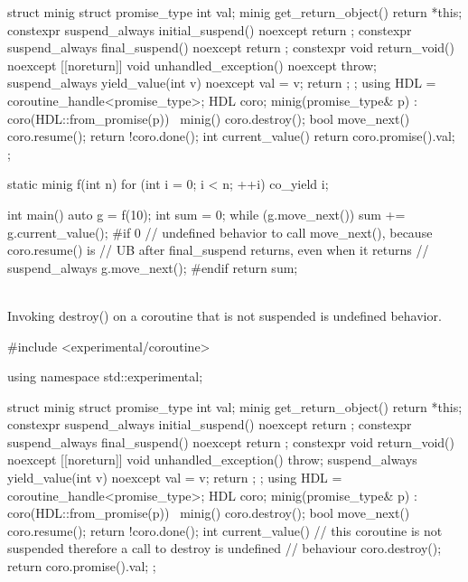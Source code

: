 {\begin{example}
\begin{codeblock}
struct minig {
  struct promise_type {
    int val;
    minig get_return_object() { return {*this}; }
    constexpr suspend_always initial_suspend() noexcept { return {}; }
    constexpr suspend_always final_suspend() noexcept { return {}; }
    constexpr void return_void() noexcept {}
    [[noreturn]] void unhandled_exception() noexcept { throw; }
    suspend_always yield_value(int v) noexcept {
      val = v;
      return {};
    }
  };
  using HDL = coroutine_handle<promise_type>;
  HDL coro;
  minig(promise_type& p) : coro(HDL::from_promise(p)) {}
  ~minig() { coro.destroy(); }
  bool move_next() {
    coro.resume();
    return !coro.done();
  }
  int current_value() { return coro.promise().val; }
};

static minig f(int n) {
  for (int i = 0; i < n; ++i)
    co_yield i;
}

int main() {
  auto g = f(10);
  int sum = 0;
  while (g.move_next())
    sum += g.current_value();
#if 0
  // undefined behavior to call move_next(), because coro.resume() is
  // UB after final_suspend returns, even when it returns
  // suspend_always
  g.move_next();
#endif
  return sum;
}
\end{codeblock}
\end{example}


\pnum
{} \\
Invoking destroy() on a coroutine that is not suspended is undefined behavior.

\pnum
\begin{example}
\begin{codeblock}
#include <experimental/coroutine>

using namespace std::experimental;

struct minig {
  struct promise_type {
    int val;
    minig get_return_object() { return {*this}; }
    constexpr suspend_always initial_suspend() noexcept { return {}; }
    constexpr suspend_always final_suspend() noexcept { return {}; }
    constexpr void return_void() noexcept {}
    [[noreturn]] void unhandled_exception() { throw; }
    suspend_always yield_value(int v) noexcept {
      val = v;
      return {};
    }
  };
  using HDL = coroutine_handle<promise_type>;
  HDL coro;
  minig(promise_type& p) : coro(HDL::from_promise(p)) {}
  ~minig() { coro.destroy(); }
  bool move_next() {
    coro.resume();
    return !coro.done();
  }
  int current_value() {
    // this coroutine is not suspended therefore a call to destroy is undefined
    // behaviour
    coro.destroy();
    return coro.promise().val;
  }
};


\end{codeblock}
\end{example}}

